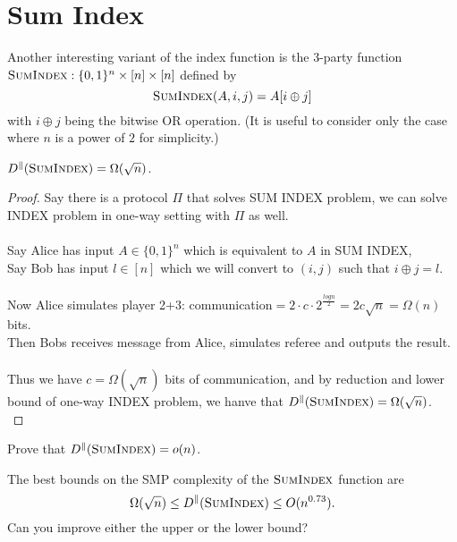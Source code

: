 \section{Sum Index}

Another interesting variant of the index function is the 3-party function $\textsc{SumIndex} : \{0,1\}^n \times [n] \times [n]$ defined by
\[
\textsc{SumIndex}(A,i,j) = A[ i \oplus j]
\]
with $i \oplus j$ being the bitwise OR operation. (It is useful to consider only the case where $n$ is a power of $2$ for simplicity.)

\begin{theorem}
	$D^\parallel(\textsc{SumIndex}) = \Omega(\sqrt{n})$.
\end{theorem}

\begin{proof}
	Say there is a protocol $\Pi$ that solves SUM INDEX problem, we can solve INDEX problem in one-way setting with $\Pi$ as well.\\
	\\
	Say Alice has input $A \in \{0,1\}^n$ which is equivalent to $A$ in SUM INDEX,\\
	Say Bob has input $l \in [n]$ which we will convert to $(i,j)$ such that $i\oplus j=l$.\\
	\\
	Now Alice simulates player 2+3: communication$=2\cdot c\cdot 2^{\frac{logn}{2}}=2c\sqrt{n}=\Omega(n)$ bits.\\
	Then Bobs receives message from Alice, simulates referee and outputs the result. \\
	\\
	Thus we have $c=\Omega(\sqrt{n})$ bits of communication, and by reduction and lower bound of one-way INDEX problem, we hanve that $D^\parallel(\textsc{SumIndex}) = \Omega(\sqrt{n})$.\\
\end{proof}

\exercises

\begin{exercise}
	Prove that $D^\parallel(\textsc{SumIndex}) = o(n)$.
\end{exercise}

\begin{open}
	The best bounds on the SMP complexity of the $\textsc{SumIndex}$ function are
	\[
	\Omega(\sqrt{n}) \le D^\parallel(\textsc{SumIndex}) \le O(n^{0.73}).
	\]
	Can you improve either the upper or the lower bound?
\end{open}